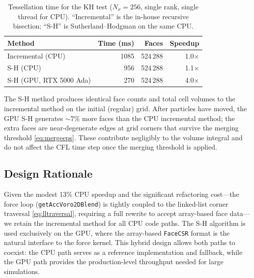 \documentclass[twocolumn]{aastex63}
\begin{document}
\begin{table}[h]
\caption{Tessellation time for the KH test ($N_x=256$, single rank,
single thread for CPU).  ``Incremental'' is the in-house recursive
bisection; ``S-H'' is Sutherland--Hodgman on the same CPU.
\label{tab:tessbench}}
\begin{tabular}{lrrr}
\toprule
Method & Time (ms) & Faces & Speedup \\
\midrule
Incremental (CPU) & 1085 & 524\,288 & 1.0$\times$ \\
S-H (CPU)         &  956 & 524\,288 & 1.1$\times$ \\
S-H (GPU, RTX 5000 Ada) & 270 & 524\,288 & 4.0$\times$ \\
\bottomrule
\end{tabular}
\end{table}

The S-H method produces identical face counts and total cell volumes
to the incremental method on the initial (regular) grid.  After
particles have moved, the GPU S-H generates $\sim\!7$\% more faces
than the CPU incremental method; the extra faces are near-degenerate
edges at grid corners that survive the merging threshold
\eqref{eq:mergeeps}.  These contribute negligibly to the volume
integral and do not affect the CFL time step once the merging
threshold is applied.

\subsection{Design Rationale}

Given the modest 13\% CPU speedup and the significant refactoring
cost---the force loop (\texttt{getAccVoro2DBlend}) is tightly
coupled to the linked-list corner traversal \eqref{eq:lltraversal},
requiring a full rewrite to accept array-based face data---we retain
the incremental method for all CPU code paths.  The S-H algorithm is
used exclusively on the GPU, where the array-based \texttt{FaceCSR}
format is the natural interface to the force kernel.  This hybrid
design allows both paths to coexist: the CPU path serves as a
reference implementation and fallback, while the GPU path provides
the production-level throughput needed for large simulations.





\end{document}
